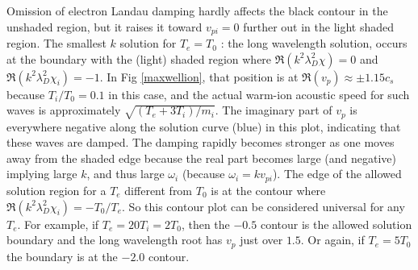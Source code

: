 \documentclass[12pt]{article}
\begin{document}
Omission of electron Landau damping hardly affects the black contour in the
unshaded region, but it raises it toward $v_{pi}=0$ further out in
the light shaded region. The smallest $k$ solution for $T_e=T_0$ : the
long wavelength solution, occurs at the boundary with the (light)
shaded region where $\Re (k^2\lambda_{D}^2 \chi)= 0$ and
$\Re (k^2\lambda_{D}^2 \chi_i)= -1$.  In Fig \ref{maxwellion}, that
position is at $\Re (v_p)\approx\pm 1.15 c_{s}$ because $T_i/T_0=0.1$
in this case, and the actual warm-ion acoustic speed for such waves is
approximately $\sqrt{(T_e+3T_i)/m_i}$. The imaginary part of $v_p$ is
everywhere negative along the solution curve (blue) in this plot,
indicating that these waves are damped. The damping rapidly becomes
stronger as one moves away from the shaded edge because the real part
becomes large (and negative) implying large $k$, and thus large
$\omega_i$ (because $\omega_i =kv_{pi}$). The edge of the allowed
solution region for a $T_e$ different from $T_0$ is at the contour
where $\Re (k^2\lambda_{D}^2 \chi_i)=-T_0/T_e$. So this contour plot
can be considered universal for any $T_e$. For example, if
$T_e=20T_i=2T_0$, then the $-0.5$ contour is the allowed solution
boundary and the long wavelength root has $v_p$ just over $1.5$. Or
again, if $T_e=5T_0$ the boundary is at the $-2.0$ contour.
\end{document}
